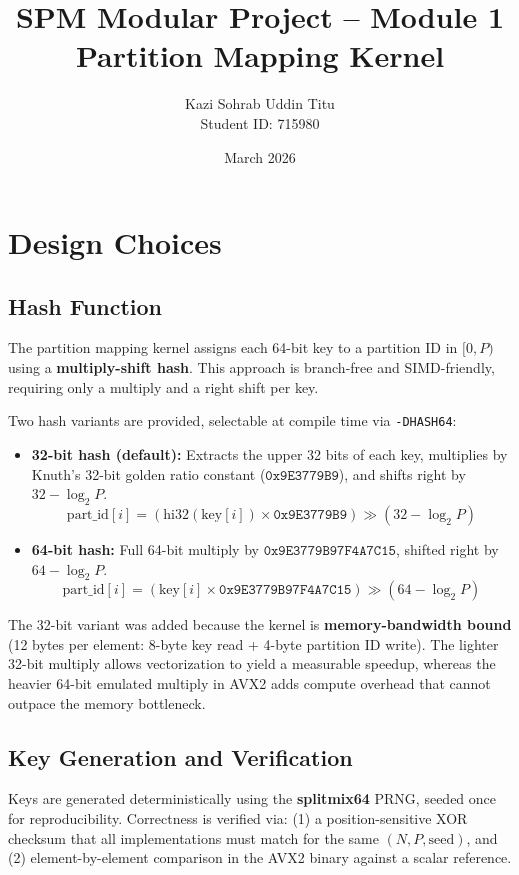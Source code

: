 \documentclass[11pt,a4paper]{article}
\title{\textbf{SPM Modular Project -- Module 1} \\ Partition Mapping Kernel}
\author{Kazi Sohrab Uddin Titu \\ Student ID: 715980}
\date{March 2026}
\begin{document}
\maketitle

\section{Design Choices}

\subsection{Hash Function}

The partition mapping kernel assigns each 64-bit key to a partition ID in $[0, P)$ using a \textbf{multiply-shift hash}. This approach is branch-free and SIMD-friendly, requiring only a multiply and a right shift per key.

Two hash variants are provided, selectable at compile time via \texttt{-DHASH64}:

\begin{itemize}
  \item \textbf{32-bit hash (default):} Extracts the upper 32 bits of each key, multiplies by Knuth's 32-bit golden ratio constant ($\texttt{0x9E3779B9}$), and shifts right by $32 - \log_2 P$.
  \[
    \text{part\_id}[i] = \left(\text{hi32}(\text{key}[i]) \times \texttt{0x9E3779B9}\right) \gg (32 - \log_2 P)
  \]

  \item \textbf{64-bit hash:} Full 64-bit multiply by $\texttt{0x9E3779B97F4A7C15}$, shifted right by $64 - \log_2 P$.
  \[
    \text{part\_id}[i] = \left(\text{key}[i] \times \texttt{0x9E3779B97F4A7C15}\right) \gg (64 - \log_2 P)
  \]
\end{itemize}

The 32-bit variant was added because the kernel is \textbf{memory-bandwidth bound} (12 bytes per element: 8-byte key read + 4-byte partition ID write). The lighter 32-bit multiply allows vectorization to yield a measurable speedup, whereas the heavier 64-bit emulated multiply in AVX2 adds compute overhead that cannot outpace the memory bottleneck.

\subsection{Key Generation and Verification}

Keys are generated deterministically using the \textbf{splitmix64} PRNG, seeded once for reproducibility. Correctness is verified via: (1) a position-sensitive XOR checksum that all implementations must match for the same $(N, P, \text{seed})$, and (2) element-by-element comparison in the AVX2 binary against a scalar reference.
\end{document}
